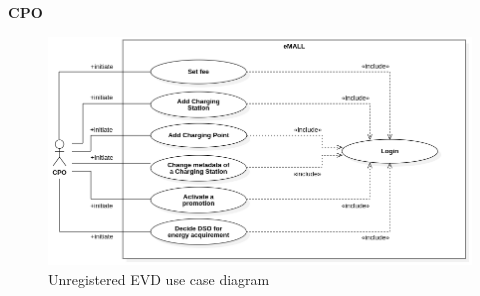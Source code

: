 \textbf{CPO}
\begin{figure} [H]
    \begin{center}
        \includegraphics[width=0.9\linewidth]{Images/UseCaseDiagrams/CPO_use_case_diagram}
        \caption{Unregistered EVD use case diagram}
        \label{fig: cpo_diag}
    \end{center}
\end{figure}

